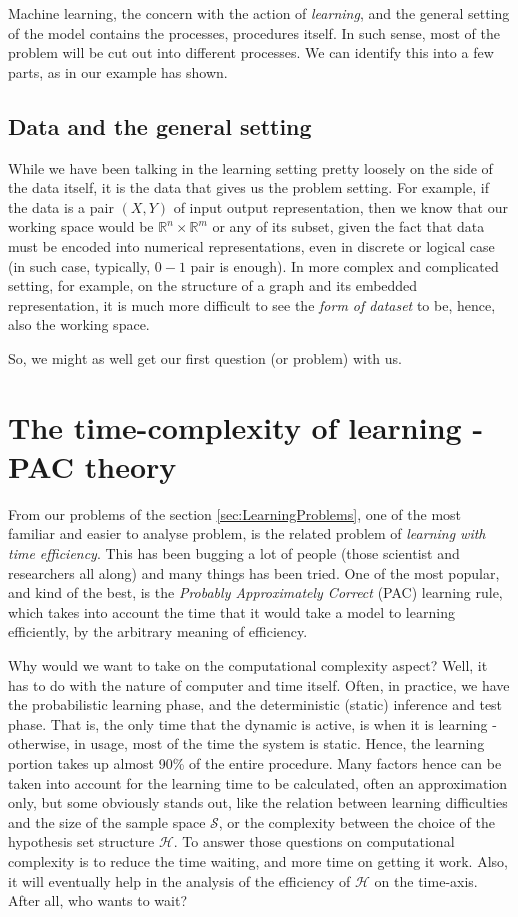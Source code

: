 Machine learning, the concern with the action of \textit{learning}, and the general setting of the model contains the processes, procedures itself. In such sense, most of the problem will be cut out into different processes. We can identify this into a few parts, as in our example has shown. 

\subsection{Data and the general setting}
While we have been talking in the learning setting pretty loosely on the side of the data itself, it is the data that gives us the problem setting. For example, if the data is a pair $(X,Y)$ of input output representation, then we know that our working space would be $\mathbb{R}^n \times \mathbb{R}^m$ or any of its subset, given the fact that data must be encoded into numerical representations, even in discrete or logical case (in such case, typically, $0-1$ pair is enough). In more complex and complicated setting, for example, on the structure of a graph and its embedded representation, it is much more difficult to see the \textit{form of dataset} to be, hence, also the working space. 

So, we might as well get our first question (or problem) with us. 

\section{The time-complexity of learning - PAC theory}

From our problems of the section \ref{sec:LearningProblems}, one of the most familiar and easier to analyse problem, is the related problem of \textit{learning with time efficiency}. This has been bugging a lot of people (those scientist and researchers all along) and many things has been tried. One of the most popular, and kind of the best, is the \textit{Probably Approximately Correct} (PAC) learning rule, which takes into account the time that it would take a model to learning efficiently, by the arbitrary meaning of efficiency.  

Why would we want to take on the computational complexity aspect? Well, it has to do with the nature of computer and time itself. Often, in practice, we have the probabilistic learning phase, and the deterministic (static) inference and test phase. That is, the only time that the dynamic is active, is when it is learning - otherwise, in usage, most of the time the system is static. Hence, the learning portion takes up almost 90\% of the entire procedure. Many factors hence can be taken into account for the learning time to be calculated, often an approximation only, but some obviously stands out, like the relation between learning difficulties and the size of the sample space $\mathcal{S}$, or the complexity between the choice of the hypothesis set structure $\mathcal{H}$. To answer those questions on computational complexity is to reduce the time waiting, and more time on getting it work. Also, it will eventually help in the analysis of the efficiency of $\mathcal{H}$ on the time-axis. After all, who wants to wait?

